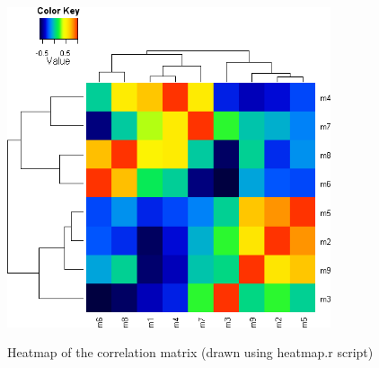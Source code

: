 \documentclass[english,a4paper,12pt]{article}
\begin{document}
\begin{figure}[!h]
    \centering
    \includegraphics[width=0.85\textwidth]{images/cor_heatmap.png} \\
    \caption[Correlation heatmap]{Heatmap of the correlation matrix (drawn using \textsf{heatmap.r} script)}
    \label{fig:cor_heatmap}
\end{figure}
\end{document}
